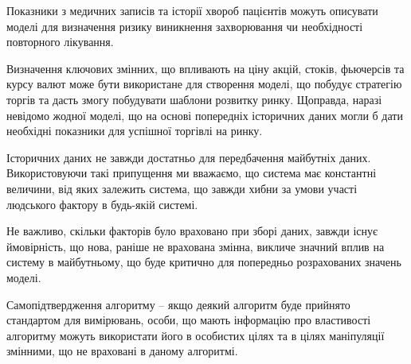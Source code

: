 Показники з медичних записів та історії хвороб пацієнтів можуть описувати моделі для визначення ризику виникнення захворювання чи необхідності повторного лікування.

Визначення ключових змінних, що впливають на ціну акцій, стоків, фьючерсів та курсу валют може бути використане для створення моделі, що побудує стратегію торгів та дасть змогу побудувати шаблони розвитку ринку. Щоправда, наразі невідомо жодної моделі, що на основі попередніх історичних даних могли б дати необхідні показники для успішної торгівлі на ринку.

Історичних даних не завжди достатньо для передбачення майбутніх даних. Використовуючи такі припущення ми вважаємо, що система має константні величини, від яких залежить система, що завжди хибни за умови участі людського фактору в будь-якій системі.

Не важливо, скільки факторів було враховано при зборі даних, завжди існує ймовірність, що нова, раніше не врахована змінна, викличе значний вплив на систему в майбутньому, що буде критично для попередньо розрахованих значень моделі.

Самопідтвердження алгоритму – якщо деякий алгоритм буде прийнято стандартом для вимірювань, особи, що мають інформацію про властивості алгоритму можуть використати його в особистих цілях та в цілях маніпуляції змінними, що не враховані в даному алгоритмі.
